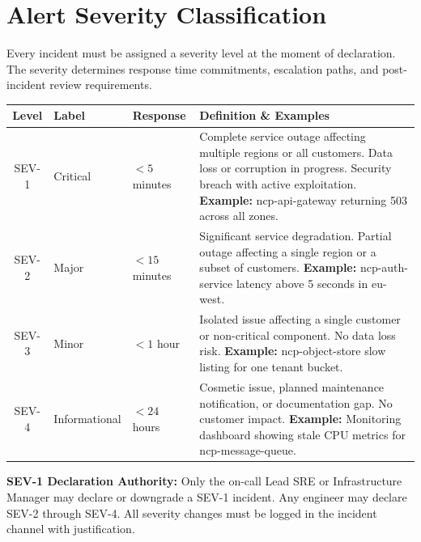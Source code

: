 \section{Alert Severity Classification}

Every incident must be assigned a severity level at the moment of declaration. The severity determines response time commitments, escalation paths, and post-incident review requirements.

\medskip
\begin{tabularx}{\textwidth}{cll>{\raggedright\arraybackslash}X}
\toprule
\textbf{Level} & \textbf{Label} & \textbf{Response} & \textbf{Definition \& Examples} \\
\midrule
\rowcolor{alertred!15} SEV-1 & Critical & $<5$ minutes & Complete service outage affecting multiple regions or all customers. Data loss or corruption in progress. Security breach with active exploitation. \textbf{Example:} ncp-api-gateway returning 503 across all zones. \\
\rowcolor{amber!15} SEV-2 & Major     & $<15$ minutes & Significant service degradation. Partial outage affecting a single region or a subset of customers. \textbf{Example:} ncp-auth-service latency above 5 seconds in eu-west. \\
\rowcolor{infoblue!10} SEV-3 & Minor     & $<1$ hour   & Isolated issue affecting a single customer or non-critical component. No data loss risk. \textbf{Example:} ncp-object-store slow listing for one tenant bucket. \\
SEV-4 & Informational & $<24$ hours & Cosmetic issue, planned maintenance notification, or documentation gap. No customer impact. \textbf{Example:} Monitoring dashboard showing stale CPU metrics for ncp-message-queue. \\
\bottomrule
\end{tabularx}

\vspace{4pt}
\begin{critbox}
\textbf{SEV-1 Declaration Authority:} Only the on-call Lead SRE or Infrastructure Manager may declare or downgrade a SEV-1 incident. Any engineer may declare SEV-2 through SEV-4. All severity changes must be logged in the incident channel with justification.
\end{critbox}
